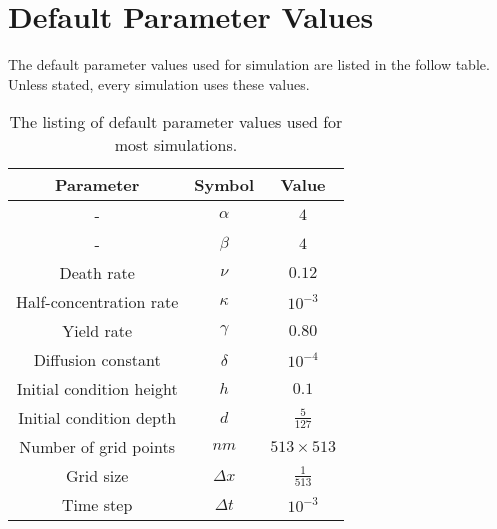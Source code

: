 
\pagestyle{appendix-param}
\chapter{Default Parameter Values}

The default parameter values used for simulation are listed in the follow table. Unless stated, every simulation uses these values.

\begin{table}[h!tb]
  \centering
  \begin{tabular}{| c | c | c |}
    \hline
    Parameter & Symbol & Value \\
    \hline
    - & $\alpha$    & $4$ \\
    - & $\beta$     & $4$ \\
    Death rate & $\nu$       & $0.12$ \\
    Half-concentration rate & $\kappa$    & $10^{-3}$ \\
    Yield rate & $\gamma$    & $0.80$ \\
    Diffusion constant & $\delta$    & $10^{-4}$ \\
    \hline
    Initial condition height & $h$ & $0.1$ \\
    Initial condition depth & $d$ & $\frac{5}{127}$ \\
    \hline
    Number of grid points & $nm$ & $513 \times 513$ \\
    Grid size & $\Delta x$  & $\frac{1}{513}$ \\
    Time step & $\Delta t$  & $10^{-3}$ \\
    \hline
  \end{tabular}
  \caption{The listing of default parameter values used for most simulations.}
  \label{tab:default-parameters}
\end{table}

